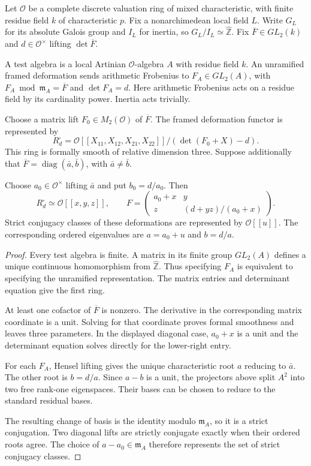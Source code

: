 Let $\mathcal O$ be a complete discrete valuation ring of mixed
characteristic, with finite residue field $k$ of characteristic $p$.
Fix a nonarchimedean local field $L$. Write $G_L$ for its absolute
Galois group and $I_L$ for inertia, so $G_L/I_L\simeq\widehat{\mathbb Z}$.
Fix $\overline F\in GL_2(k)$ and $d\in\mathcal O^\times$ lifting
$\det\overline F$.

A test algebra is a local Artinian
$\mathcal O$-algebra $A$ with residue field $k$.
An unramified framed deformation sends arithmetic Frobenius to
$F_A\in GL_2(A)$, with $F_A\bmod\mathfrak m_A=\overline F$
and $\det F_A=d$.
Here arithmetic Frobenius acts on a residue field by its cardinality
power. Inertia acts trivially.

\begin{proposition}
\label{v4-arith:ic:w5-e:local:framed-unramified}
Choose a matrix lift $F_0\in M_2(\mathcal O)$ of $\overline F$.
The framed deformation functor is represented by
\[
 R_d^\square=
 \mathcal O[[X_{11},X_{12},X_{21},X_{22}]]/
       (\det(F_0+X)-d).
\]
This ring is formally smooth of relative dimension three.
Suppose additionally that
$\overline F=\operatorname{diag}(\bar a,\bar b)$, with
$\bar a\ne\bar b$.

Choose $a_0\in\mathcal O^\times$ lifting $\bar a$
and put $b_0=d/a_0$. Then
\[
 R_d^\square\simeq\mathcal O[[x,y,z]],\qquad
 F=\begin{pmatrix}
 a_0+x&y\\ z&(d+yz)/(a_0+x)
 \end{pmatrix}.
\]
Strict conjugacy classes of these deformations are represented by
$\mathcal O[[u]]$. The corresponding ordered eigenvalues are
$a=a_0+u$ and $b=d/a$.
\end{proposition}

\begin{proof}
Every test algebra is finite. A matrix in its finite group $GL_2(A)$
defines a unique continuous homomorphism from $\widehat{\mathbb Z}$.
Thus specifying $F_A$ is equivalent to specifying the unramified
representation. The matrix entries and determinant equation give the
first ring.

At least one cofactor of $\overline F$ is nonzero. The derivative in
the corresponding matrix coordinate is a unit. Solving for that
coordinate proves formal smoothness and leaves three parameters.
In the displayed diagonal case, $a_0+x$ is a unit and the determinant
equation solves directly for the lower-right entry.

For each $F_A$, Hensel lifting gives the unique characteristic root
$a$ reducing to $\bar a$. The other root is $b=d/a$.
Since $a-b$ is a unit, the projectors above split $A^2$ into two
free rank-one eigenspaces. Their bases can be chosen to reduce to the
standard residual bases.

The resulting change of basis is the identity
modulo $\mathfrak m_A$, so it is a strict conjugation.
Two diagonal lifts are strictly conjugate exactly when their ordered
roots agree. The choice of $a-a_0\in\mathfrak m_A$ therefore represents
the set of strict conjugacy classes.
\end{proof}

